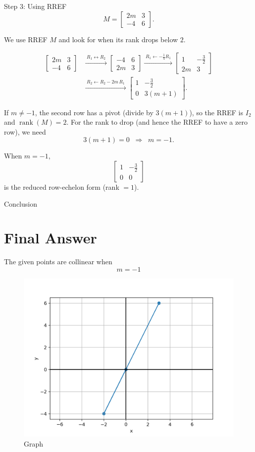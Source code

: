 \documentclass{beamer}
\begin{document}
\begin{frame}{Step 3: Using RREF}
\[
M=\begin{bmatrix}
2m & 3\\
-4 & 6
\end{bmatrix}.
\]

We use RREF \(M\) and look for when its rank drops below \(2\).

\[
\begin{aligned}
\begin{bmatrix}
2m & 3\\
-4 & 6
\end{bmatrix}
&\xrightarrow{\;R_1 \leftrightarrow R_2\;}
\begin{bmatrix}
-4 & 6\\
2m & 3
\end{bmatrix}
\xrightarrow{\;R_1\gets -\tfrac14 R_1\;}
\begin{bmatrix}
1 & -\tfrac{3}{2}\\
2m & 3
\end{bmatrix}\\[6pt]
&\xrightarrow{\;R_2\gets R_2-2m\,R_1\;}
\begin{bmatrix}
1 & -\tfrac{3}{2}\\
0 & 3(m+1)
\end{bmatrix}.
\end{aligned}
\]

If \(m\neq -1\), the second row has a pivot (divide by \(3(m+1)\)), so the RREF is \(I_2\) and \(\operatorname{rank}(M)=2\).
For the rank to drop (and hence the RREF to have a zero row), we need
\[
3(m+1)=0 \;\;\Rightarrow\;\; m=-1.
\]

When \(m=-1\),
\[
\begin{bmatrix}
1 & -\tfrac{3}{2}\\
0 & 0
\end{bmatrix}
\]
is the reduced row-echelon form (rank \(=1\)).

\end{frame}

\begin{frame}{Conclusion}
\section*{Final Answer}
The given points are collinear when
\[
\boxed{m = -1}
\]

\begin{center}
\end{center}

\begin{figure}[h!]
    \centering
    \includegraphics[width=0.65\linewidth]{figs/fig.png}
    \caption{Graph}
\end{figure}
\end{frame}
\end{document}
